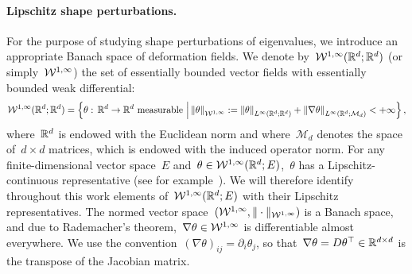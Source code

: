         \paragraph{Lipschitz shape perturbations.}
        For the purpose of studying shape perturbations of eigenvalues, we introduce an appropriate Banach space of deformation fields.
        We denote by~${\mathcal{W}}^{1,\infty}(\mathbb{R}^d;\mathbb{R}^d)$ (or simply~${\mathcal{W}}^{1,\infty}$) the set of essentially bounded vector fields with essentially bounded weak differential:
        \begin{equation}
            \label{03:eq:lipschitz_functions}
            {\mathcal{W}}^{1,\infty}(\mathbb{R}^d;\mathbb{R}^d) = \left\{\theta:\,\mathbb{R}^d\to\mathbb{R}^d\text{ measurable } \middle|\,\left\|\theta\right\|_{{\mathcal{W}}^{1,\infty}} :=\left\|\theta\right\|_{L^{\infty}\left(\mathbb{R}^d;\mathbb{R}^d\right)} + \left\|\nabla\theta\right\|_{L^{\infty}\left(\mathbb{R}^d;\mathcal M_d\right)} < +\infty\right\},
        \end{equation}
        where~$\mathbb{R}^d$ is endowed with the Euclidean norm and where~$\mathcal M_d$ denotes the space of~$d\times d$ matrices, which is endowed with the induced operator norm.
        For any finite-dimensional vector space~$E$ and~$\theta\in {\mathcal{W}}^{1,\infty}(\mathbb{R}^d;E)$,~$\theta$ has a Lipschitz-continuous representative (see for example~\cite[Section 5.8.2.b, Theorem 4]{E22}). We will therefore identify throughout this work elements of~${\mathcal{W}}^{1,\infty}(\mathbb{R}^d;E)$ with their Lipschitz representatives.
        The normed vector space~$({\mathcal{W}}^{1,\infty},\|\cdot\|_{{\mathcal{W}}^{1,\infty}})$ is a Banach space, and due to Rademacher's theorem,~$\nabla\theta\in {\mathcal{W}}^{1,\infty}$ is differentiable almost everywhere.
        We use the convention~$(\nabla \theta)_{ij} = \partial_i \theta_j$, so that~$\nabla \theta = D\theta^\top \in \mathbb{R}^{d\times d}$ is the transpose of the Jacobian matrix.

